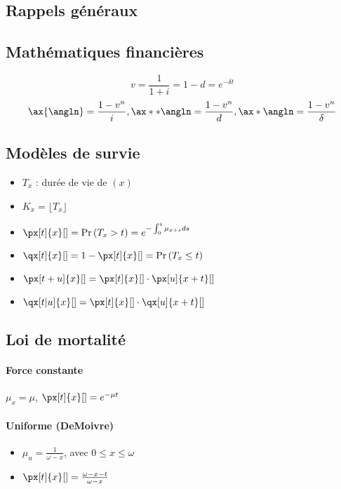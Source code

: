 \documentclass[10pt, french]{article}
\begin{document}
\begin{multicols*}{2} %
\section{Rappels généraux}
\subsection*{Mathématiques financières}
\[v = \frac{1}{1+i} = 1 - d = e^{-\delta t}\]
\[ \ax{\angln} = \frac{1 - v^n}{i}, \ax**{\angln} = \frac{1 - v^n}{d}, \ax*{\angln} = \frac{1 - v^n}{\delta}  \]

\subsection*{Modèles de survie}
\begin{itemize}
\item $T_x$ : durée de vie de $(x)$
\item $K_x =  \lfloor T_x \rfloor$
\item $\px[t]{x}[] = \prob{T_x > t} = e^{- \int_{0}^{t} \mu_{x+s} ds}$
\item $\qx[t]{x}[] = 1 - \px[t]{x}[] = \prob{T_x \leq t}$
\item $\px[t + u]{x}[] = \px[t]{x}[] \cdot \px[u]{x+t}[]$
\item $\qx[t|u]{x}[] = \px[t]{x}[] \cdot \qx[u]{x+t}[]$
\end{itemize}

\subsection*{Loi de mortalité}
\paragraph{Force constante}
$\mu_x = \mu$, $\px[t]{x}[] = e^{-\mu t}$

\paragraph{Uniforme (DeMoivre)}
\begin{itemize}
\item  $\mu_u = \frac{1}{\omega - x}$, avec $0 \leq x \leq \omega$
\item $\px[t]{x}[] = \frac{\omega - x - t}{\omega - x}$
\end{itemize}


\end{multicols*}
\end{document}
